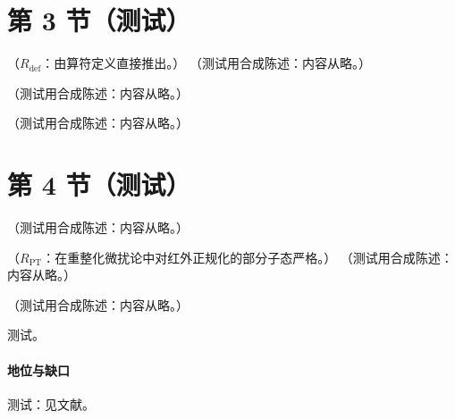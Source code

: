 \section{第 3 节（测试）}\label{sec:scet-decoupling}

\begin{theorem}\label{thm:scet-decoupling}
（$R_{\mathrm{def}}$：由算符定义直接推出。）
（测试用合成陈述：内容从略。）
\end{theorem}

\begin{example}\label{ex:scet-decoupling-tree}
（测试用合成陈述：内容从略。）
\end{example}

\begin{remark}[$Y_n$ 的方向与 $i0$]\label{rem:scet-y-direction}
（测试用合成陈述：内容从略。）
\end{remark}

\section{第 4 节（测试）}\label{sec:scet-scet2}

\begin{definition}[零箱减除]\label{def:scet-zero-bin}
（测试用合成陈述：内容从略。）
\end{definition}

\begin{proposition}\label{prop:scet-scet2}
（$R_{\mathrm{PT}}$：在重整化微扰论中对红外正规化的部分子态严格。）
（测试用合成陈述：内容从略。）
\end{proposition}

\begin{proposition}\label{prop:scet-rapidity-rg}
（测试用合成陈述：内容从略。）
\end{proposition}
\begin{proofsketch}测试。\end{proofsketch}
\paragraph{地位与缺口}测试：见文献。

